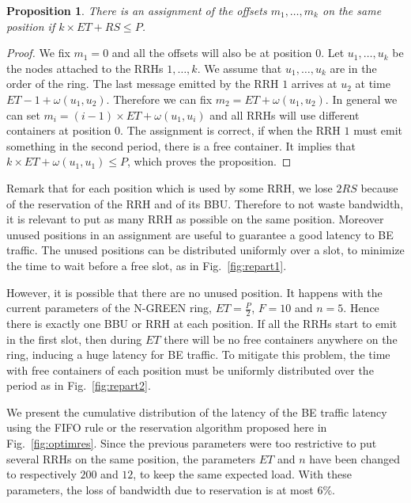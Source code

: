 \documentclass[]{algotel}
\newtheorem{prop}{Proposition}
\begin{document}
\begin{prop}
There is an assignment of the offsets $m_1, \dots, m_k$ on the same position if  $k\times ET + RS \leq P$.
\end{prop}
\begin{proof}
 We fix $m_1 = 0$ and all the offsets will also be at position $0$. 
 Let $u_1,\dots,u_k$ be the nodes attached to the RRHs $1,\dots,k$. We assume that $u_1,\dots,u_k$ are in the order of the ring. The last message emitted by the RRH $1$ arrives at $u_2$ at time $ET - 1 + \omega(u_1,u_2)$. Therefore we can fix $m_2 =  ET  + \omega(u_1,u_2)$. In general we can set $m_i = (i-1) \times ET + \omega(u_1,u_i)$ and all RRHs will use different containers at position $0$. The assignment is correct, if when the RRH $1$ must emit something in the second period, there is a free container. It implies that  $k \times ET + \omega(u_1,u_1) \leq P$, which proves the proposition.
\end{proof}

Remark that for each position which is used by some RRH, we lose $2RS$ because of the reservation of the RRH and of its BBU.
Therefore to not waste bandwidth, it is relevant to put as many RRH as possible on the same position. Moreover unused positions in an assignment are useful to guarantee a good latency to BE traffic. The unused positions can be distributed uniformly over a slot, to minimize the time to wait before a free slot, as in Fig.~\ref{fig:repart1}.  

However, it is possible that there are no unused position. It happens with the current parameters of the N-GREEN ring,
$ET = \frac{P}{2}$, $F = 10$ and $n = 5$. Hence there is exactly one  BBU or RRH at each position. If all the RRHs start to emit in the first slot, then during $ET$ there will be no free containers anywhere on the ring, inducing a huge latency for BE traffic. 
To mitigate this problem, the time with free containers of each position must be uniformly distributed over the period as in Fig.~\ref{fig:repart2}.

We present the cumulative distribution of the latency of the BE traffic latency using the FIFO rule or the reservation algorithm proposed here in
Fig.~\ref{fig:optimres}. Since the previous parameters were too restrictive to put several RRHs on the same position, the parameters $ET$ and $n$ have been changed to respectively $200$ and $12$, to keep the same expected load. With these parameters, the loss of bandwidth due to reservation is at most $6\%$.
 
\end{document}

